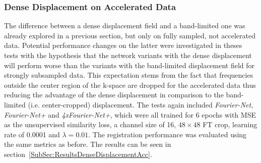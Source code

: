 \subsubsection{Dense Displacement on Accelerated Data} \label{SubSubSec:DenseDisplacementAcc}
The difference between a dense displacement field and a band-limited one was already explored in a previous section, but only on fully sampled, not accelerated data. Potential performance changes on the latter were investigated in theses tests with the hypothesis that the network variants with the dense displacement will perform worse than the variants with the band-limited displacement field for strongly subsampled data. This expectation stems from the fact that frequencies outside the center region of the k-space are dropped for the accelerated data thus reducing the advantage of the dense displacement in comparison to the band-limited (i.e. center-cropped) displacement. The tests again included \emph{Fourier-Net}, \emph{Fourier-Net+} and \emph{4xFourier-Net+}, which were all trained for 6 epochs with MSE as the unsupervised similarity loss, a channel size of 16, $48 \times 48$ FT crop, learning rate of 0.0001 and $\lambda=0.01$. The registration performance was evaluated using the same metrics as before. The results can be seen in section~\ref{SubSec:ResultsDenseDisplacementAcc}.

